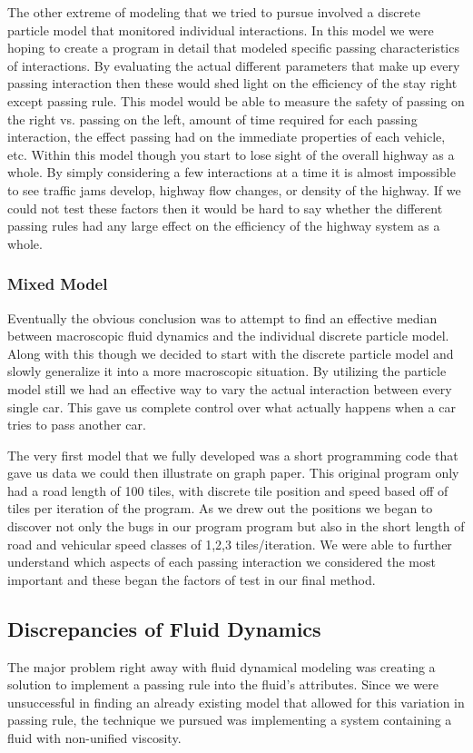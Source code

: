 \documentclass{amsart}
\begin{document}
	The other extreme of modeling that we tried to pursue involved a discrete particle model that monitored individual interactions.  In this model we were hoping to create a program in detail that modeled specific passing characteristics of interactions.  By evaluating the actual different parameters that make up every passing interaction then these would shed light on the efficiency of the stay right except passing rule.  This model would be able to measure the safety of passing on the right vs. passing on the left, amount of time required for each passing interaction, the effect passing had on the immediate properties of each vehicle, etc.  
	Within this model though you start to lose sight of the overall highway as a whole.  By simply considering a few interactions at a time it is almost impossible to see traffic jams develop, highway flow changes, or density of the highway.  If we could not test these factors then it would be hard to say whether the different passing rules had any large effect on the efficiency of the highway system as a whole.  
		
		\subsubsection{Mixed Model}
		
	Eventually the obvious conclusion was to attempt to find an effective median between macroscopic fluid dynamics and the individual discrete particle model.  Along with this though we decided to start with the discrete particle model and slowly generalize it into a more macroscopic situation.  By utilizing the particle model still we had an effective way to vary the actual interaction between every single car.  This gave us complete control over what actually happens when a car tries to pass another car.  
	
	The very first model that we fully developed was a short programming code that gave us data we could then illustrate on graph paper.  This original program only had a road length of 100 tiles, with discrete tile position and speed based off of tiles per iteration of the program.  As we drew out the positions we began to discover not only the bugs in our program program but also in the short length of road and vehicular speed classes of 1,2,3 tiles/iteration.  We were able to further understand which aspects of each passing interaction we considered the most important and these began the factors of test in our final method.  

	\subsection{Discrepancies of Fluid Dynamics}
	The major problem right away with fluid dynamical modeling was creating a solution to implement a passing rule into the fluid's attributes. Since we were unsuccessful in finding an already existing model that allowed for this variation in passing rule, the technique we pursued was implementing a system containing a fluid with non-unified viscosity. 
	
\end{document}
